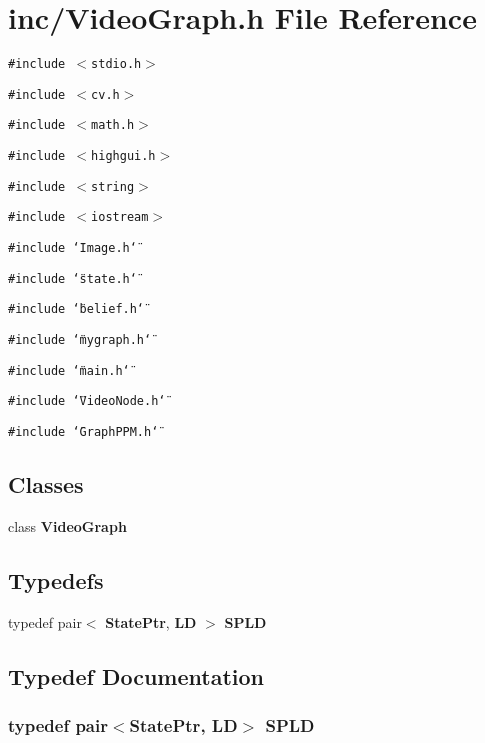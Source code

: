 \section{inc/VideoGraph.h File Reference}
\label{VideoGraph_8h}
{\tt \#include $<$stdio.h$>$}\par
{\tt \#include $<$cv.h$>$}\par
{\tt \#include $<$math.h$>$}\par
{\tt \#include $<$highgui.h$>$}\par
{\tt \#include $<$string$>$}\par
{\tt \#include $<$iostream$>$}\par
{\tt \#include \char`\"{}Image.h\char`\"{}}\par
{\tt \#include \char`\"{}state.h\char`\"{}}\par
{\tt \#include \char`\"{}belief.h\char`\"{}}\par
{\tt \#include \char`\"{}mygraph.h\char`\"{}}\par
{\tt \#include \char`\"{}main.h\char`\"{}}\par
{\tt \#include \char`\"{}VideoNode.h\char`\"{}}\par
{\tt \#include \char`\"{}GraphPPM.h\char`\"{}}\par
\subsection*{Classes}
\begin{CompactItemize}
\item 
class {\bf VideoGraph}
\end{CompactItemize}
\subsection*{Typedefs}
\begin{CompactItemize}
\item 
typedef pair$<$ {\bf StatePtr}, {\bf LD} $>$ {\bf SPLD}
\end{CompactItemize}


\subsection{Typedef Documentation}
\subsubsection{\setlength{\rightskip}{0pt plus 5cm}typedef pair$<${\bf StatePtr}, {\bf LD}$>$ {\bf SPLD}}\label{VideoGraph_8h_4ec597fb49521c02d8de14db7575649b}


